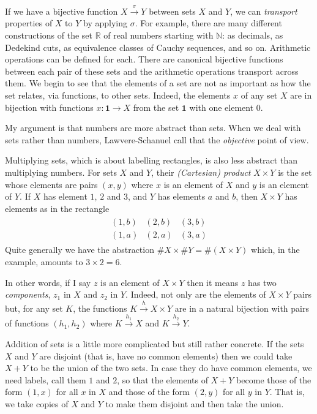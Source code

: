\documentclass[a4paper,12pt]{article}
\theoremstyle{step}
\newcommand{\xra}{\xrightarrow}
\begin{document}
If we have a bijective function $X\xra{\sigma} Y$ between sets $X$ and $Y$, we can {\em transport}
properties of $X$ to $Y$ by applying $\sigma$. For example, there are many different constructions of the set
$\mathbb{R}$ of real numbers starting with $\mathbb{N}$: as decimals, as Dedekind cuts, as equivalence classes of Cauchy sequences, and so on. Arithmetic operations can be defined for each. There are canonical bijective functions between each pair of these sets and the arithmetic operations transport across them. We begin to see that the elements of a set are not as important as how the set relates, via functions, to other sets. Indeed, the elements $x$ of any set $X$ are in bijection with functions $x : \mathbf{1}\to X$ from the set $\mathbf{1}$ with one element $0$.  

My argument is that numbers are more abstract than sets. When we deal with sets rather than numbers, Lawvere-Schanuel call that the {\em objective} point of view. 

Multiplying sets, which is about labelling rectangles, is also less abstract than multiplying numbers. For sets $X$ and $Y$, their {\em (Cartesian) product} $X\times Y$ is the set whose elements
are pairs $(x,y)$ where $x$ is an element of $X$ and $y$ is an element of $Y$. If $X$ has element $1$, $2$ and $3$, and $Y$ has elements $a$ and $b$, then $X\times Y$ has elements as in the rectangle
\begin{eqnarray*}
\begin{matrix} (1,b) & (2,b) & (3,b) \\
(1,a) & (2,a) & (3,a)
\end {matrix}
\end{eqnarray*}
Quite generally we have the abstraction $\# X\times \# Y = \# (X\times Y)$ which, in the example, amounts to $3\times 2 = 6$. 

In other words, if I say $z$ is an element of $X\times Y$ then it means $z$ has two {\em components}, 
$z_1$ in $X$ and $z_2$ in $Y$. Indeed, not only are the elements of $X\times Y$ pairs but, 
for any set $K$, the functions $K\xra{h} X\times Y$ are in a natural bijection with pairs of 
functions $(h_1,h_2)$ where $K\xra{h_1} X$ and $K\xra{h_2} Y$.  

Addition of sets is a little more complicated but still rather concrete. If the sets $X$ and $Y$ are
disjoint (that is, have no common elements) then we could take $X+Y$ to be the union of the two sets. In case they do have common elements, we need labels, call them $1$ and $2$, 
so that the elements of
$X+Y$ become those of the form $(1,x)$ for all $x$ in $X$ and those of the form $(2,y)$ for all $y$ in $Y$. That is, we take copies of $X$ and $Y$ to make them disjoint and then take the union. 
\end{document}
